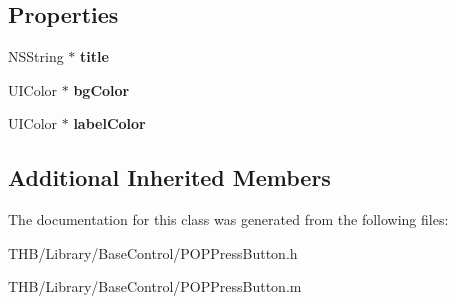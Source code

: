 \subsection*{Properties}
\begin{DoxyCompactItemize}
\item 
\mbox{\label{interface_p_o_p_press_button_a275c0e8af287d0e60c8804db65812888}} 
N\+S\+String $\ast$ {\bfseries title}
\item 
\mbox{\label{interface_p_o_p_press_button_a43fc395fb46b8b65cdcce37e6595afba}} 
U\+I\+Color $\ast$ {\bfseries bg\+Color}
\item 
\mbox{\label{interface_p_o_p_press_button_a8d7d68f5ab45703b85d93b91b08d6fae}} 
U\+I\+Color $\ast$ {\bfseries label\+Color}
\end{DoxyCompactItemize}
\subsection*{Additional Inherited Members}


The documentation for this class was generated from the following files\+:\begin{DoxyCompactItemize}
\item 
T\+H\+B/\+Library/\+Base\+Control/P\+O\+P\+Press\+Button.\+h\item 
T\+H\+B/\+Library/\+Base\+Control/P\+O\+P\+Press\+Button.\+m\end{DoxyCompactItemize}
